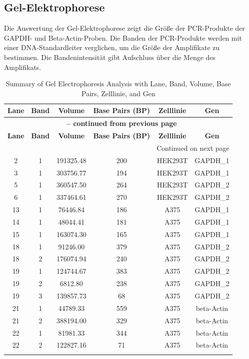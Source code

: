 \documentclass{article}
\begin{document}
\subsection*{Gel-Elektrophorese}

Die Auswertung der Gel-Elektrophorese zeigt die Größe der PCR-Produkte der GAPDH- und Beta-Actin-Proben. Die Banden der PCR-Produkte werden mit einer DNA-Standardleiter verglichen, um die Größe der Amplifikate zu bestimmen. Die Bandenintensität gibt Aufschluss über die Menge des Amplifikats. 


\begin{longtable}{|c|c|c|c|c|c|}
    \hline
    \textbf{Lane} & \textbf{Band} & \textbf{Volume} & \textbf{Base Pairs (BP)} & \textbf{Zelllinie} & \textbf{Gen} \\
    \hline
    \endfirsthead
    \multicolumn{6}{c}{{\bfseries \tablename\ \thetable{} -- continued from previous page}} \\
    \hline
    \textbf{Lane} & \textbf{Band} & \textbf{Volume} & \textbf{Base Pairs (BP)} & \textbf{Zelllinie} & \textbf{Gen} \\
    \hline
    \endhead
    \hline \multicolumn{6}{|r|}{{Continued on next page}} \\ \hline
    \endfoot
    \hline
    \endlastfoot
    
    2 & 1 & 191325.48 & 200 & HEK293T & GAPDH\_1 \\
    \hline
    3 & 1 & 303756.77 & 194 & HEK293T & GAPDH\_1 \\
    \hline
    5 & 1 & 360547.50 & 264 & HEK293T & GAPDH\_2 \\
    \hline
    6 & 1 & 337464.61 & 270 & HEK293T & GAPDH\_2 \\
    \hline
    13 & 1 & 76446.84 & 186 & A375 & GAPDH\_1 \\
    \hline
    14 & 1 & 48044.41 & 181 & A375 & GAPDH\_1 \\
    \hline
    15 & 1 & 163074.30 & 165 & A375 & GAPDH\_1 \\
    \hline
    18 & 1 & 91246.00 & 379 & A375 & GAPDH\_2 \\
    18 & 2 & 176074.94 & 240 & A375 & GAPDH\_2 \\
    \hline
    19 & 1 & 124744.67 & 383 & A375 & GAPDH\_2 \\
    19 & 2 & 6812.80 & 238 & A375 & GAPDH\_2 \\
    19 & 3 & 139857.73 & 68 & A375 & GAPDH\_2 \\
    \hline
    21 & 1 & 44789.33 & 559 & A375 & beta-Actin \\
    21 & 2 & 388194.00 & 329 & A375 & beta-Actin \\
    \hline
    22 & 1 & 81981.33 & 344 & A375 & beta-Actin \\
    22 & 2 & 122827.16 & 71 & A375 & beta-Actin \\
    \hline
    
    \caption{Summary of Gel Electrophoresis Analysis with Lane, Band, Volume, Base Pairs, Zelllinie, and Gen}
    \label{table:gel_analysis_detailed}
    \end{longtable}
    
\end{document}
